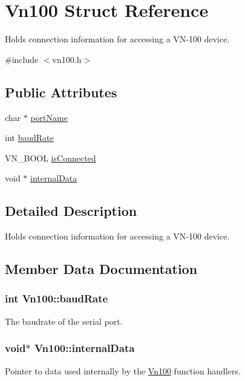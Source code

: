 \hypertarget{structVn100}{}\section{Vn100 Struct Reference}
\label{structVn100}


Holds connection information for accessing a V\+N-\/100 device.  




{\ttfamily \#include $<$vn100.\+h$>$}

\subsection*{Public Attributes}
\begin{DoxyCompactItemize}
\item 
char $\ast$ \hyperlink{structVn100_ac7e68c79da77f130a724748c5dadc123}{port\+Name}
\item 
int \hyperlink{structVn100_a833f12ba9f62b2344213d909a48d11f0}{baud\+Rate}
\item 
V\+N\+\_\+\+B\+O\+OL \hyperlink{structVn100_ae1d8b339e830f4d813119a20cf983a19}{is\+Connected}
\item 
void $\ast$ \hyperlink{structVn100_acd74e4f2da90b64e5e31eb4e2e884cdd}{internal\+Data}
\end{DoxyCompactItemize}


\subsection{Detailed Description}
Holds connection information for accessing a V\+N-\/100 device. 

\subsection{Member Data Documentation}
\subsubsection[{\texorpdfstring{baud\+Rate}{baudRate}}]{\setlength{\rightskip}{0pt plus 5cm}int Vn100\+::baud\+Rate}\hypertarget{structVn100_a833f12ba9f62b2344213d909a48d11f0}{}\label{structVn100_a833f12ba9f62b2344213d909a48d11f0}
The baudrate of the serial port. 
\subsubsection[{\texorpdfstring{internal\+Data}{internalData}}]{\setlength{\rightskip}{0pt plus 5cm}void$\ast$ Vn100\+::internal\+Data}\hypertarget{structVn100_acd74e4f2da90b64e5e31eb4e2e884cdd}{}\label{structVn100_acd74e4f2da90b64e5e31eb4e2e884cdd}
Pointer to data used internally by the \hyperlink{structVn100}{Vn100} function handlers. 
